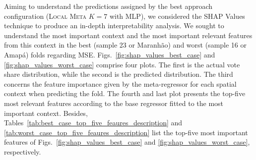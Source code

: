 \documentclass[runningheads]{llncs}
\begin{document}



Aiming to understand the predictions assigned by the best approach configuration (\textsc{Local Meta $K=7$} with MLP), we considered the SHAP Values technique to produce an in-depth interpretability analysis. We sought to understand the most important context and the most important relevant features from this context in the best (sample 23 or Maranhão) and worst (sample 16 or Amapá) folds regarding MSE. Figs.~\ref{fig:shap_values_best_case} and \ref{fig:shap_values_worst_case} comprise four plots. The first is the actual vote share distribution, while the second is the predicted distribution. The third concerns the feature importance given by the meta-regressor for each spatial context when predicting the fold. The fourth and last plot presents the top-five most relevant features according to the base regressor fitted to the most important context. Besides, Tables~\ref{tab:best_case_top_five_feaures_description} and \ref{tab:worst_case_top_five_feaures_description} list the top-five most important features of Figs.~\ref{fig:shap_values_best_case} and \ref{fig:shap_values_worst_case}, respectively.
\end{document}
